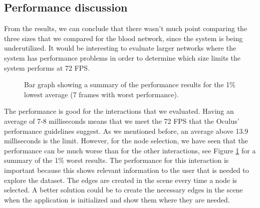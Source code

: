 \subsection{Performance discussion}
From the results, we can conclude that there wasn't much point comparing the three sizes that we compared for the blood network, since the system is being underutilized. It would be interesting to evaluate larger networks where the system has performance problems in order to determine which size limits the system performs at 72 FPS.

\begin{figure}[h!]
\centering
{}
\caption{Bar graph showing a summary of the performance results for the 1\% lowest average (7 frames with worst performance).}
\label{fig:performance_bar}
\end{figure}

The performance is good for the interactions that we evaluated. Having an average of 7-8 milliseconds means that we meet the 72 FPS that the Oculus' performance guidelines suggest. As we mentioned before, an average above 13.9 milliseconds is the limit. However, for the node selection, we have seen that the performance can be much worse than for the other interactions, see Figure \ref{fig:performance_bar} for a summary of the 1\% worst results. The performance for this interaction is important because this shows relevant information to the user that is needed to explore the dataset. The edges are created in the scene every time a node is selected. A better solution could be to create the necessary edges in the scene when the application is initialized and show them where they are needed.

